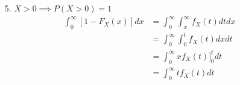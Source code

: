 \documentclass[11pt]{amsart}
\theoremstyle{definition}
\begin{document}
\begin{itemize}
\begin{itemize}
\end{itemize}

\item[5.] $X>0\implies P(X>0)=1$
\begin{align*}
    \int_0^\infty[1-F_X(x)]dx
    &=\int_0^\infty\int_x^\infty f_X(t)dtdx \\
    &=\int_0^\infty\int_0^t f_X(t)dxdt \\
    &=\int_0^\infty xf_X(t)]_0^tdt \\
    &=\int_0^\infty tf_X(t)dt \\
\end{align*}

\end{itemize}
\end{document}
